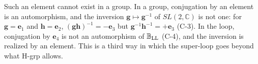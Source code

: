 Such an element cannot exist in a group. In a group, conjugation by an element is an automorphism, and
the inversion $\mathbf g\mapsto\mathbf g^{-1}$ of $SL(2,\mathbb C)$ is not one: for $\mathbf g=\mathbf e_1$
and $\mathbf h=\mathbf e_2$, $(\mathbf g\mathbf h)^{-1}=-\mathbf e_3$ but $\mathbf g^{-1}\mathbf
h^{-1}=+\mathbf e_3$ (C-3). In the loop, conjugation by $\mathbf e_4$ is not an automorphism of
$\mathbb B_{\rm LL}$ (C-4), and the inversion is realized by an element. This is a third way in which
the super-loop goes beyond what H-grp allows.
